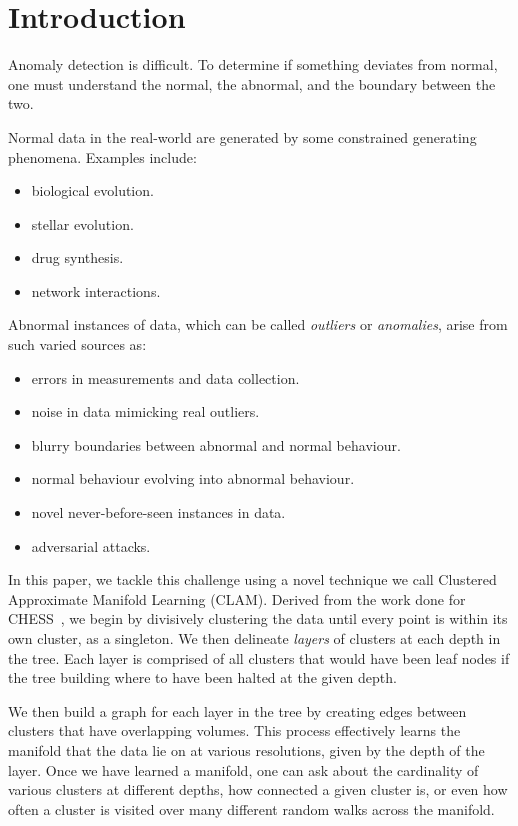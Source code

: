 \section{Introduction}
\label{sec:introduction}

Anomaly detection is difficult.
To determine if something deviates from normal, one must understand the normal, the abnormal, and the boundary between the two.

Normal data in the real-world are generated by some constrained generating phenomena.
Examples include:
\begin{itemize}
    \item biological evolution.
    \item stellar evolution.
    \item drug synthesis.
    \item network interactions.
\end{itemize}

Abnormal instances of data, which can be called \textit{outliers} or \textit{anomalies}, arise from such varied sources as:
\begin{itemize}
    \item errors in measurements and data collection.
    \item noise in data mimicking real outliers.
    \item blurry boundaries between abnormal and normal behaviour.
    \item normal behaviour evolving into abnormal behaviour.
    \item novel never-before-seen instances in data.
    \item adversarial attacks.
\end{itemize}

In this paper, we tackle this challenge using a novel technique we call Clustered Approximate Manifold Learning (CLAM).
Derived from the work done for CHESS~\cite{ishaq2019entropy}, we begin by divisively clustering the data until every point is within its own cluster, as a singleton.
We then delineate \textit{layers} of clusters at each depth in the tree.
Each layer is comprised of all clusters that would have been leaf nodes if the tree building where to have been halted at the given depth.

We then build a graph for each layer in the tree by creating edges between clusters that have overlapping volumes.
This process effectively learns the manifold that the data lie on at various resolutions, given by the depth of the layer.
Once we have learned a manifold, one can ask about the cardinality of various clusters at different depths, how connected a given cluster is, or even how often a cluster is visited over many different random walks across the manifold.

